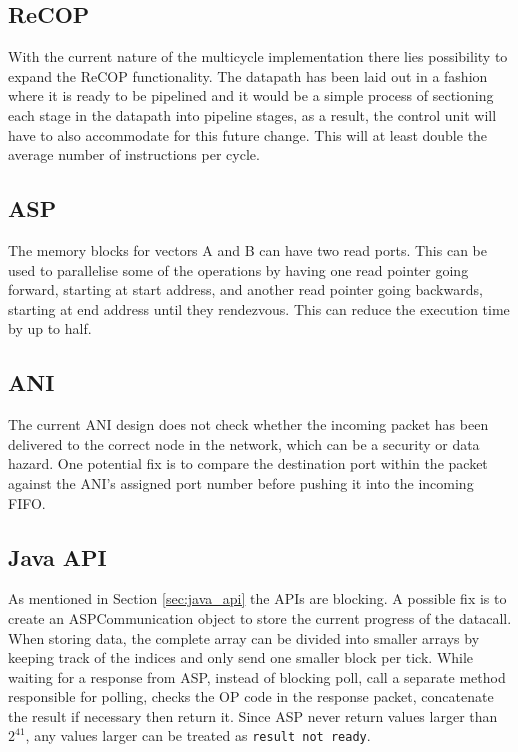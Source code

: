 \documentclass[]{article}
\begin{document}
	\subsection{ReCOP}
	With the current nature of the multicycle implementation there lies possibility to expand the ReCOP functionality. The datapath has been laid out in a fashion where it is ready to be pipelined and it would be a simple process of sectioning each stage in the datapath into pipeline stages, as a result, the control unit will have to also accommodate for this future change. This will at least double the average number of instructions per cycle.
	
	\subsection{ASP}
	The memory blocks for vectors A and B can have two read ports. This can be used to parallelise some of the operations by having one read pointer going forward, starting at start address, and another read pointer going backwards, starting at end address until they rendezvous. This can reduce the execution time by up to half.
	
	\subsection{ANI}
	The current ANI design does not check whether the incoming packet has been delivered to the correct node in the network, which can be a security or data hazard. One potential fix is to compare the destination port within the packet against the ANI's assigned port number before pushing it into the incoming FIFO.
	
	\subsection{Java API}
	As mentioned in Section \ref{sec:java_api} the APIs are blocking. A possible fix is to create an ASPCommunication object to store the current progress of the datacall. When storing data, the complete array can be divided into smaller arrays by keeping track of the indices and only send one smaller block per tick. While waiting for a response from ASP, instead of blocking poll, call a separate method responsible for polling, checks the OP code in the response packet, concatenate the result if necessary then return it. Since ASP never return values larger than $2^{41}$, any values larger can be treated as \texttt{result not ready}.
	
\end{document}
